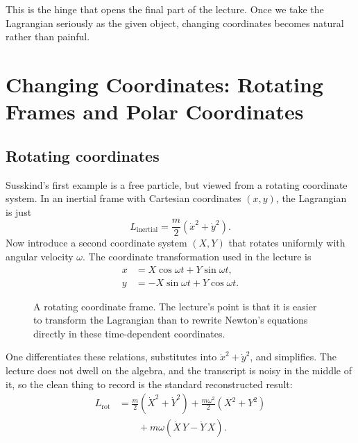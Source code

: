 This is the hinge that opens the final part of the lecture. Once we take the Lagrangian seriously as the given object, changing coordinates becomes natural rather than painful.

\section{Changing Coordinates: Rotating Frames and Polar Coordinates}

\subsection{Rotating coordinates}

Susskind's first example is a free particle, but viewed from a rotating coordinate system. In an inertial frame with Cartesian coordinates \((x,y)\), the Lagrangian is just
\begin{equation}
L_{\mathrm{inertial}}=\frac{m}{2}\left(\dot x^2+\dot y^2\right).
\end{equation}
Now introduce a second coordinate system \((X,Y)\) that rotates uniformly with angular velocity \(\omega\). The coordinate transformation used in the lecture is
\begin{equation}
\begin{aligned}
x&=X\cos\omega t+Y\sin\omega t,\\
y&=-X\sin\omega t+Y\cos\omega t.
\end{aligned}
\end{equation}

\begin{figure}[h]
\centering
{}
\caption{A rotating coordinate frame. The lecture's point is that it is easier to transform the Lagrangian than to rewrite Newton's equations directly in these time-dependent coordinates.}
\end{figure}

One differentiates these relations, substitutes into \(\dot x^2+\dot y^2\), and simplifies. The lecture does not dwell on the algebra, and the transcript is noisy in the middle of it, so the clean thing to record is the standard reconstructed result:
\begin{equation}
\begin{aligned}
L_{\mathrm{rot}}
&=
\frac{m}{2}\left(\dot X^2+\dot Y^2\right)
+
\frac{m\omega^2}{2}\left(X^2+Y^2\right)\\
&\qquad
+ m\omega(\dot X\,Y-\dot Y\,X).
\end{aligned}
\end{equation}

